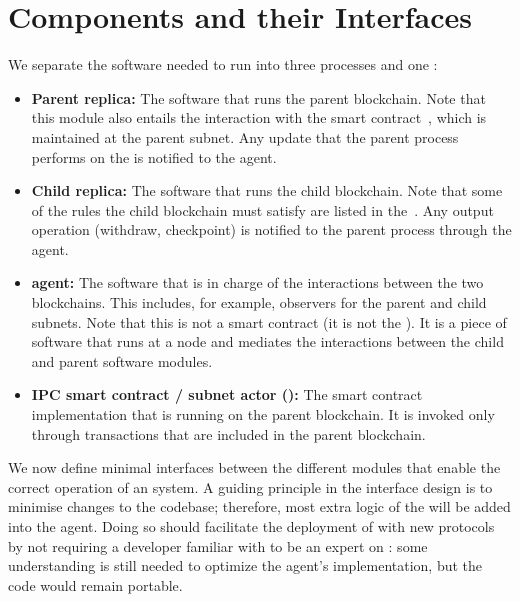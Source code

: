  \section{Components and their Interfaces}
 \label{sec:components}
We separate the software needed to run \nameAbbr into three processes and one \dapp:

\begin{itemize}
    \item \textbf{Parent \smr replica:} The software that runs the parent blockchain. Note that this module also entails the interaction with the \nameAbbr smart contract~\sa, which is maintained at the parent subnet. Any update that the parent process performs on the \sa is notified to the \nameAbbr agent.
    \item \textbf{Child \smr replica:} The software that runs the child blockchain. Note that some of the rules the child blockchain must satisfy are listed in the~\sa. Any output operation (withdraw, checkpoint) is notified to the parent process through the \nameAbbr agent. 
    \item \textbf{\nameAbbr agent:} The software that is in charge of the interactions between the two blockchains. This includes, for example, observers for the parent and child subnets. Note that this is not a smart contract (it is not the \sa). It is a piece of software that runs at a node and mediates the interactions between the child and parent \smr software modules.
    \item \textbf{IPC smart contract / subnet actor (\sa):} The smart contract implementation that is running on the parent blockchain. It is invoked only through transactions that are included in the parent blockchain.
\end{itemize}

We now define minimal interfaces between the different modules that enable the correct operation of an \nameFull system.
A guiding principle in the interface design is to minimise changes to the \smr codebase; therefore, most extra logic of the \nameAbbr will be added into the \nameAbbr agent. Doing so should facilitate the deployment of \nameAbbr with new \smr protocols by not requiring a developer familiar with \nameAbbr to be an expert on \smr: some understanding is still needed to optimize the agent's implementation, but the \smr code would remain portable.

